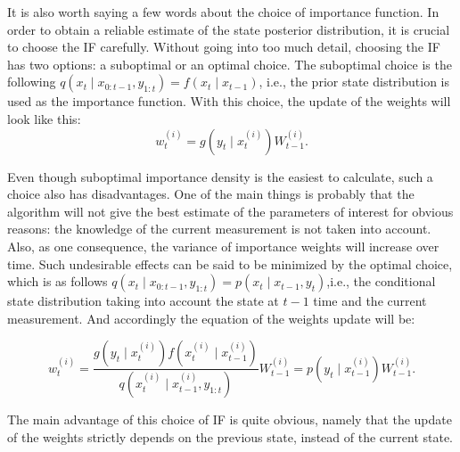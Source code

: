 It is also worth saying a few words about the choice of importance function. In order to obtain a reliable estimate of the state posterior distribution, it is crucial to choose the IF carefully. Without going into too much detail, choosing the IF has two options: a suboptimal or an optimal choice. The suboptimal choice is the following \(q\left(x_t \mid x_{0: t-1}, y_{1: t}\right)=f\left(x_t \mid x_{t-1}\right)\), i.e., the prior state distribution is used as the importance function. With this choice, the update of the weights will look like this:
\begin{equation}
    w_t^{(i)}= g\left(y_t \mid x_t^{(i)}\right) W_{t-1}^{(i)}.
    \label{eq:weights_update_using_state_distribution_as_if}
\end{equation}

Even though suboptimal importance density is the easiest to calculate, such a choice also has disadvantages. One of the main things is probably that the algorithm will not give the best estimate of the parameters of interest for obvious reasons: the knowledge of the current measurement is not taken into account. Also, as one consequence, the variance of importance weights will increase over time.
Such undesirable effects can be said to be minimized by the optimal choice, which is as follows
\(q\left(x_t \mid x_{0: t-1}, y_{1: t}\right)=p\left(x_t \mid x_{t-1}, y_t\right)\),i.e., the conditional state distribution taking into account the state at \(t-1\) time and the current measurement. And accordingly the equation of the weights update will be: 

\begin{equation}
w_t^{(i)}= \frac{g\left(y_t \mid x_t^{(i)}\right) f\left(x_t^{(i)} \mid x_{t-1}^{(i)}\right)}{q\left(x_t^{(i)} \mid x_{t-1}^{(i)}, y_{1: t}\right)} W_{t-1}^{(i)} = p\left(y_t \mid x_{t-1}^{(i)}\right) W_{t-1}^{(i)}.
\end{equation}

The main advantage of this choice of IF is quite obvious, namely that the update of the weights strictly depends on the previous state, instead of the current state.

